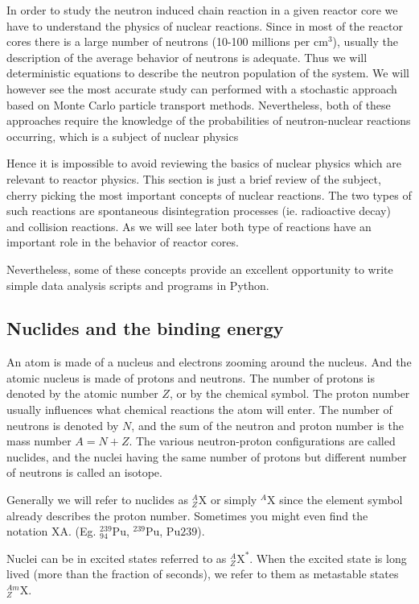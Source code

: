 In order to study the neutron induced chain reaction in a given reactor core we have to understand the physics of nuclear reactions. Since in most of the reactor cores there is a large number of neutrons (10-100 millions per cm${}^3$), usually the description of the average behavior of neutrons is adequate. Thus we will deterministic equations to describe the neutron population of the system. We will however see the most accurate study can performed with a stochastic approach based on Monte Carlo particle transport methods. Nevertheless, both of these approaches require the knowledge of the probabilities of neutron-nuclear reactions occurring, which is a subject of nuclear physics

Hence it is impossible to avoid reviewing the basics of nuclear physics which are relevant to reactor physics. This section is just a brief review of the subject, cherry picking the most important concepts of nuclear reactions. The two types of such reactions are spontaneous  disintegration processes (ie. radioactive decay) and collision reactions.  As we will see later both type of reactions have an important role in the behavior of reactor cores. 

Nevertheless, some of these concepts provide an excellent opportunity to write simple data analysis scripts and programs in Python.

\subsection{Nuclides and the binding energy}

An atom is made of a nucleus and electrons zooming around the nucleus. And the atomic nucleus is made of protons and neutrons. The number of protons is denoted by the atomic number $Z$, or by the chemical symbol. The proton number usually influences what chemical reactions the atom will enter. The number of neutrons is denoted by $N$, and the sum of the neutron and proton number is the mass number $A=N+Z$. The various neutron-proton configurations are called nuclides, and the nuclei having the same number of protons but different number of neutrons is called an isotope. 

Generally we will refer to nuclides as ${}_Z^A\text{X}$ or simply ${}^A\text{X}$ since the element symbol already describes the proton number. Sometimes you might even find the notation $\text{X}\text{A}$. (Eg. ${}_{94}^{239}\text{Pu}$, ${}^{239}\text{Pu}$, $\text{Pu}239$).

Nuclei can be in excited states referred to as ${}_Z^A\text{X}^*$. When the excited state is long lived (more than the fraction of seconds), we refer to them as metastable states~${}_Z^{Am}\text{X}$.

